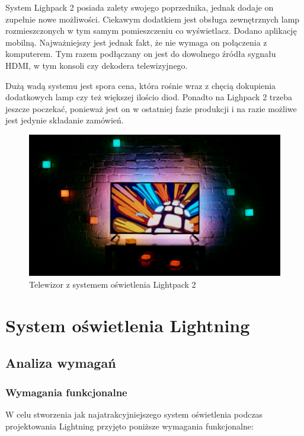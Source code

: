 \documentclass[12pt]{report}
\begin{document}
System Lighpack 2 posiada zalety swojego poprzednika, jednak dodaje on zupełnie nowe możliwości. Ciekawym dodatkiem jest obsługa zewnętrznych lamp rozmieszczonych w tym samym pomieszczeniu co wyświetlacz. Dodano aplikację mobilną. Najważniejszy jest jednak fakt, że nie wymaga on połączenia z komputerem. Tym razem podłączany on jest do dowolnego źródła sygnału HDMI, w tym konsoli czy dekodera telewizyjnego.

Dużą wadą systemu jest spora cena, która rośnie wraz z chęcią dokupienia dodatkowych lamp czy też większej ilościo diod. Ponadto na Lighpack 2 trzeba jeszcze poczekać, ponieważ jest on w ostatniej fazie produkcji i na razie możliwe jest jedynie składanie zamówień.

\begin{figure}[h]
\centering
\includegraphics[width=\textwidth]{../resources/lightpack2m.jpg}
\caption[Telewizor z systemem oświetlenia Lightpack 2]{Telewizor z systemem oświetlenia Lightpack 2 \cite{lp2s}}
\end{figure}

\chapter{System oświetlenia Lightning}

\section{Analiza wymagań}

\subsection{Wymagania funkcjonalne}

W celu stworzenia jak najatrakcyjniejszego system oświetlenia podczas projektowania Lightning przyjęto poniższe wymagania funkcjonalne:
\end{document}
